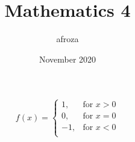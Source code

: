 \documentclass{article}
\title{Mathematics 4}
\author{afroza}
\date{November 2020}
\begin{document}
\maketitle

\[f(x)=
\begin{cases}
   1,&\text{for }x>0\\
   0,&\text{for }x=0\\
   -1,&\text{for }x<0\\
\end{cases}\]
\end{document}

